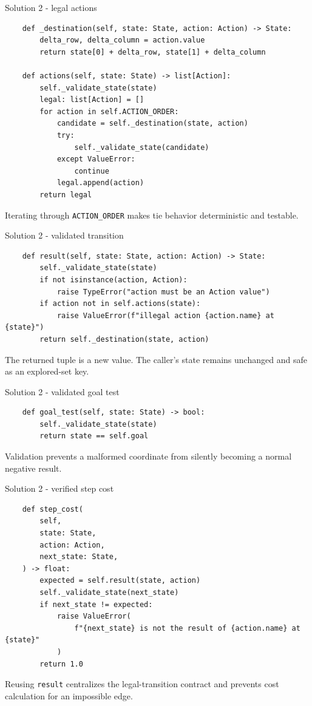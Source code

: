 \documentclass[aspectratio=169,11pt]{beamer}
\begin{document}
\begin{frame}[fragile]{Solution 2 - legal actions}
\begin{lstlisting}
    def _destination(self, state: State, action: Action) -> State:
        delta_row, delta_column = action.value
        return state[0] + delta_row, state[1] + delta_column

    def actions(self, state: State) -> list[Action]:
        self._validate_state(state)
        legal: list[Action] = []
        for action in self.ACTION_ORDER:
            candidate = self._destination(state, action)
            try:
                self._validate_state(candidate)
            except ValueError:
                continue
            legal.append(action)
        return legal
\end{lstlisting}
\answerlabel Iterating through \texttt{ACTION\_ORDER} makes tie behavior
deterministic and testable.
\end{frame}

\begin{frame}[fragile]{Solution 2 - validated transition}
\begin{lstlisting}
    def result(self, state: State, action: Action) -> State:
        self._validate_state(state)
        if not isinstance(action, Action):
            raise TypeError("action must be an Action value")
        if action not in self.actions(state):
            raise ValueError(f"illegal action {action.name} at {state}")
        return self._destination(state, action)
\end{lstlisting}
\answerlabel The returned tuple is a new value. The caller's state remains
unchanged and safe as an explored-set key.
\end{frame}

\begin{frame}[fragile]{Solution 2 - validated goal test}
\begin{lstlisting}
    def goal_test(self, state: State) -> bool:
        self._validate_state(state)
        return state == self.goal
\end{lstlisting}
\answerlabel Validation prevents a malformed coordinate from silently becoming a
normal negative result.
\end{frame}

\begin{frame}[fragile]{Solution 2 - verified step cost}
\begin{lstlisting}
    def step_cost(
        self,
        state: State,
        action: Action,
        next_state: State,
    ) -> float:
        expected = self.result(state, action)
        self._validate_state(next_state)
        if next_state != expected:
            raise ValueError(
                f"{next_state} is not the result of {action.name} at {state}"
            )
        return 1.0
\end{lstlisting}
  \answerlabel Reusing \texttt{result} centralizes the legal-transition contract
  and prevents cost calculation for an impossible edge.
\end{frame}
\end{document}

